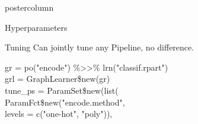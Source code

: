 \documentclass{beamer}
\newcommand{\codeinline}[1]{\begin{codeboxinline}#1\end{codeboxinline}}
\begin{document}
\begin{frame}[fragile]{}
\begin{columns}
\begin{column}{.245\textwidth}
\begin{beamercolorbox}[center]{postercolumn}
\begin{minipage}{.98\textwidth}
{\begin{myblock}{Hyperparameters}
            \end{myblock}
              \vspace{-1.0em}
           \begin{myblock}{Tuning}
              \vspace{-1.0em}
             Can jointly tune any Pipeline, no difference.  
             \begin{codeboxexample}
						  {\footnotesize
               gr = po("encode") \%>{}>\% lrn("classif.rpart")\\
               grl = GraphLearner\$new(gr)\\
               tune\_ps = ParamSet\$new(list(\\
               \hspace*{1ex} ParamFct\$new("encode.method",\\ 
               \hspace*{3ex} levels = c("one-hot", "poly")),\\
}
\end{codeboxexample}
\end{myblock}}
\end{minipage}
\end{beamercolorbox}
\end{column}
\end{columns}
\end{frame}
\end{document}
